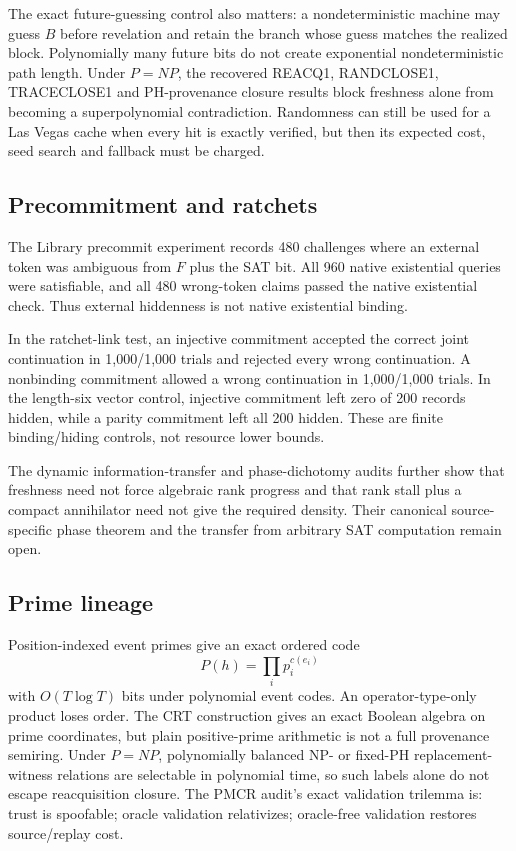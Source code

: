 \documentclass[11pt]{article}
\begin{document}
The exact future-guessing control also matters: a nondeterministic machine may
guess $B$ before revelation and retain the branch whose guess matches the
realized block.  Polynomially many future bits do not create exponential
nondeterministic path length.  Under $P=NP$, the recovered REACQ1,
RANDCLOSE1, TRACECLOSE1 and PH-provenance closure results block freshness alone
from becoming a superpolynomial contradiction.  Randomness can still be used
for a Las Vegas cache when every hit is exactly verified, but then its expected
cost, seed search and fallback must be charged.

\subsection{Precommitment and ratchets}

The Library precommit experiment records 480 challenges where an external
token was ambiguous from $F$ plus the SAT bit.  All 960 native existential
queries were satisfiable, and all 480 wrong-token claims passed the native
existential check.  Thus external hiddenness is not native existential
binding.

In the ratchet-link test, an injective commitment accepted the correct joint
continuation in 1,000/1,000 trials and rejected every wrong continuation.  A
nonbinding commitment allowed a wrong continuation in 1,000/1,000 trials.  In
the length-six vector control, injective commitment left zero of 200 records
hidden, while a parity commitment left all 200 hidden.  These are finite
binding/hiding controls, not resource lower bounds.

The dynamic information-transfer and phase-dichotomy audits further show that
freshness need not force algebraic rank progress and that rank stall plus a
compact annihilator need not give the required density.  Their canonical
source-specific phase theorem and the transfer from arbitrary SAT computation
remain open.

\subsection{Prime lineage}

Position-indexed event primes give an exact ordered code
\[
        P(h)=\prod_i p_i^{c(e_i)}
\]
with $O(T\log T)$ bits under polynomial event codes.  An operator-type-only
product loses order.  The CRT construction gives an exact Boolean algebra on
prime coordinates, but plain positive-prime arithmetic is not a full
provenance semiring.  Under $P=NP$, polynomially balanced NP- or fixed-PH
replacement-witness relations are selectable in polynomial time, so such
labels alone do not escape reacquisition closure.  The PMCR audit's exact
validation trilemma is: trust is spoofable; oracle validation relativizes;
oracle-free validation restores source/replay cost.
\end{document}
